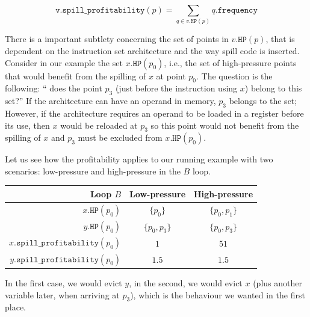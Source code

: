 {\begin{definition}
  $$\texttt{v.spill\_profitability}(p) = \sum_{q\in v.\texttt{HP}(p)} q.\texttt{frequency}$$
\end{definition}

There is a important subtlety concerning the set of points in $v.\texttt{HP}(p)$, that is dependent on the instruction set architecture and the way spill code is inserted.
Consider in our example the set $x.\texttt{HP}(p_0)$, i.e., the set of high-pressure points that would benefit from the spilling of $x$ at point $p_0$.
The question is the following: `` does the point $p_3$ (just before the instruction using $x$) belong to this set?''
If the architecture can have an operand in memory, $p_3$ belongs to the set;
However, if the architecture requires an operand to be loaded in a register before its use, then $x$ would be reloaded at $p_3$ so this point would not benefit from the spilling of $x$ and $p_3$ must be excluded from $x.\texttt{HP}(p_0)$.

Let us see how the profitability applies to our running example with two scenarios: low-pressure and high-pressure in the $B$ loop.

\begin{center}
  \begin{tabular}{r@{\quad}cc}
  Loop $B$ & Low-pressure & High-pressure \\
  \hline
  $x.\texttt{HP}(p_0)$ & $\{p_0\}$ & $\{p_0,p_1\}$ \\
  $y.\texttt{HP}(p_0)$ & $\{p_0,p_3\}$ & $\{p_0,p_3\}$ \\
  $x.\texttt{spill\_profitability}(p_0)$ & $1$ & $51$ \\
  $y.\texttt{spill\_profitability}(p_0)$ & $1.5$ & $1.5$ \\
\end{tabular}
\end{center}

In the first case, we would evict $y$, in the second, we would evict $x$ (plus another variable later, when arriving at $p_3$), which is the behaviour we wanted in the first place.

}
